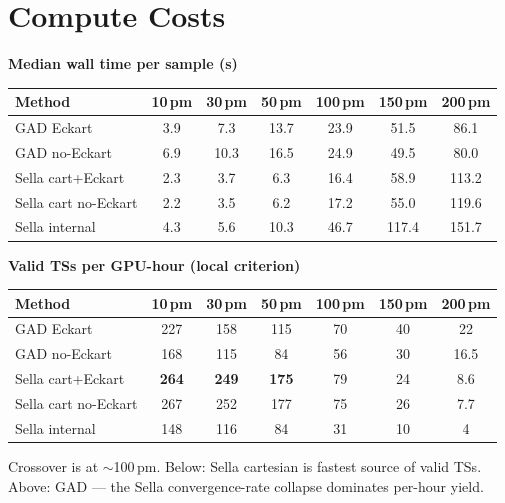 \documentclass[11pt]{article}
\begin{document}
\newpage
\clearpage
\section{Compute Costs}

\begin{center}
\textbf{Median wall time per sample (s)} \\[0.3em]
\begin{tabular}{l|cccccc}
\toprule
Method & 10\,pm & 30\,pm & 50\,pm & 100\,pm & 150\,pm & 200\,pm \\
\midrule
GAD Eckart                  & 3.9 & 7.3 & 13.7 & 23.9 & 51.5 & 86.1 \\
GAD no-Eckart               & 6.9 & 10.3 & 16.5 & 24.9 & 49.5 & 80.0 \\
Sella cart+Eckart           & 2.3 & 3.7 & 6.3 & 16.4 & 58.9 & 113.2 \\
Sella cart no-Eckart        & 2.2 & 3.5 & 6.2 & 17.2 & 55.0 & 119.6 \\
Sella internal              & 4.3 & 5.6 & 10.3 & 46.7 & 117.4 & 151.7 \\
\bottomrule
\end{tabular}
\end{center}

\begin{center}
\textbf{Valid TSs per GPU-hour (local criterion)} \\[0.3em]
\begin{tabular}{l|cccccc}
\toprule
Method & 10\,pm & 30\,pm & 50\,pm & 100\,pm & 150\,pm & 200\,pm \\
\midrule
GAD Eckart                  & 227 & 158 & 115 & 70 & 40 & 22 \\
GAD no-Eckart               & 168 & 115 & 84 & 56 & 30 & 16.5 \\
Sella cart+Eckart           & \textbf{264} & \textbf{249} & \textbf{175} & 79 & 24 & 8.6 \\
Sella cart no-Eckart        & 267 & 252 & 177 & 75 & 26 & 7.7 \\
Sella internal              & 148 & 116 & 84 & 31 & 10 & 4 \\
\bottomrule
\end{tabular}
\end{center}

Crossover is at $\sim$100\,pm. Below: Sella cartesian is fastest source
of valid TSs. Above: GAD --- the Sella convergence-rate collapse
dominates per-hour yield.
\end{document}
